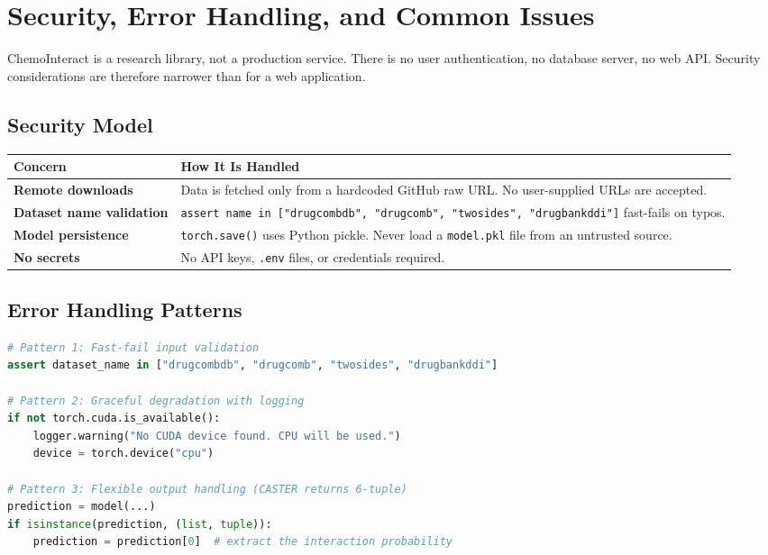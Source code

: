 \documentclass[12pt,a4paper,oneside]{book}
\begin{document}
\chapter{Security, Error Handling, and Common Issues}\label{chap:security}

\begin{tcolorbox}[notebox]
ChemoInteract is a research library, not a production service. There is no user authentication, no database server, no web API. Security considerations are therefore narrower than for a web application.
\end{tcolorbox}

\section{Security Model}

\begin{longtable}{>{\bfseries}p{4cm}p{10cm}}
\toprule
Concern & How It Is Handled \\
\midrule\endhead
Remote downloads & Data is fetched only from a hardcoded GitHub raw URL. No user-supplied URLs are accepted. \\
\midrule
Dataset name validation & \texttt{assert name in ["drugcombdb", "drugcomb", "twosides", "drugbankddi"]} fast-fails on typos. \\
\midrule
Model persistence & \texttt{torch.save()} uses Python pickle. Never load a \texttt{model.pkl} file from an untrusted source. \\
\midrule
No secrets & No API keys, \texttt{.env} files, or credentials required. \\
\bottomrule
\end{longtable}

\section{Error Handling Patterns}

\begin{lstlisting}[language=Python]
# Pattern 1: Fast-fail input validation
assert dataset_name in ["drugcombdb", "drugcomb", "twosides", "drugbankddi"]

# Pattern 2: Graceful degradation with logging
if not torch.cuda.is_available():
    logger.warning("No CUDA device found. CPU will be used.")
    device = torch.device("cpu")

# Pattern 3: Flexible output handling (CASTER returns 6-tuple)
prediction = model(...)
if isinstance(prediction, (list, tuple)):
    prediction = prediction[0]  # extract the interaction probability
\end{lstlisting}
\end{document}
